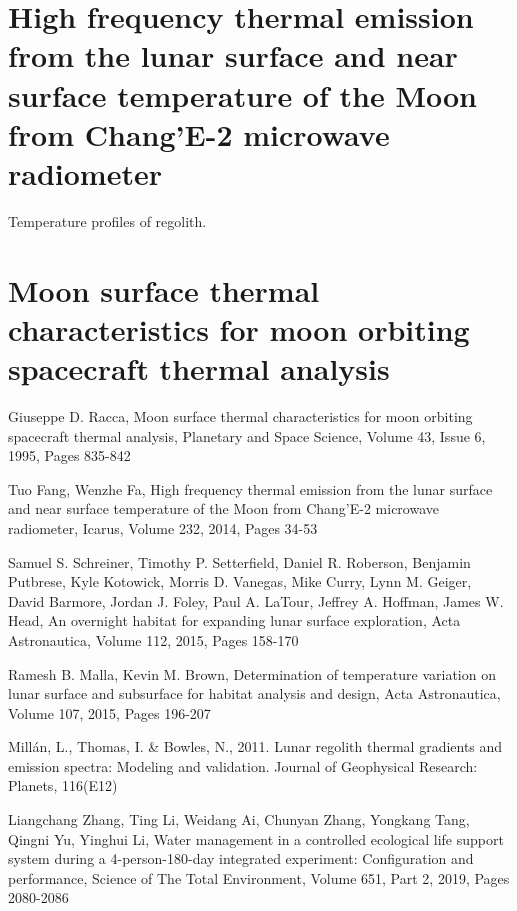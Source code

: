 \documentclass[prl,onecolumn]{revtex4-1}  %
\begin{document}
\section{High frequency thermal emission from the lunar surface and near surface temperature of the Moon from Chang’E-2 microwave radiometer}
Temperature profiles of regolith.
\citep{Tuo}


\section{Moon surface thermal characteristics for moon orbiting spacecraft thermal analysis}
\citep{Giuseppe}


\begin{thebibliography}{99}

Giuseppe D. Racca,
Moon surface thermal characteristics for moon orbiting spacecraft thermal analysis,
Planetary and Space Science,
Volume 43, Issue 6,
1995,
Pages 835-842



Tuo Fang, Wenzhe Fa,
High frequency thermal emission from the lunar surface and near surface temperature of the Moon from Chang’E-2 microwave radiometer,
Icarus,
Volume 232,
2014,
Pages 34-53



Samuel S. Schreiner, Timothy P. Setterfield, Daniel R. Roberson, Benjamin Putbrese, Kyle Kotowick, Morris D. Vanegas, Mike Curry, Lynn M. Geiger, David Barmore, Jordan J. Foley, Paul A. LaTour, Jeffrey A. Hoffman, James W. Head,
An overnight habitat for expanding lunar surface exploration,
Acta Astronautica,
Volume 112,
2015,
Pages 158-170



Ramesh B. Malla, Kevin M. Brown,
Determination of temperature variation on lunar surface and subsurface for habitat analysis and design,
Acta Astronautica,
Volume 107,
2015,
Pages 196-207


 Mill{\'a}n, L., Thomas, I. \& Bowles, N., 2011. Lunar regolith thermal gradients and emission spectra: Modeling and validation. Journal of Geophysical Research: Planets, 116(E12)


Liangchang Zhang, Ting Li, Weidang Ai, Chunyan Zhang, Yongkang Tang, Qingni Yu, Yinghui Li,
Water management in a controlled ecological life support system during a 4-person-180-day integrated experiment: Configuration and performance,
Science of The Total Environment,
Volume 651, Part 2,
2019,
Pages 2080-2086



\end{thebibliography}
\end{document}
